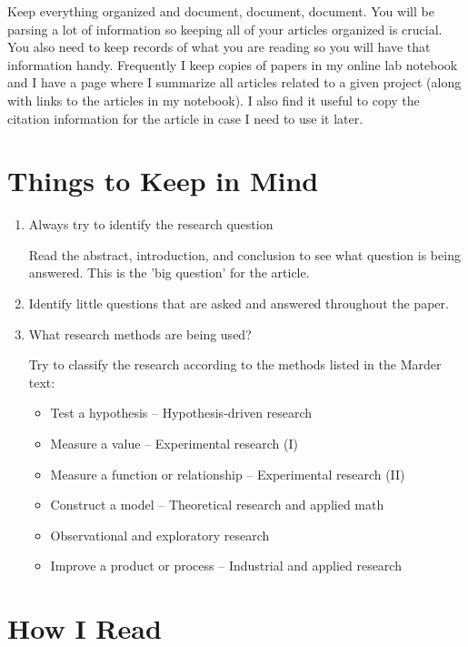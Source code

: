 \documentclass[12pt, letterpaper]{article}
\begin{document}
Keep everything organized and document, document, document.  You will be parsing a lot of information so keeping all of your articles organized is crucial.  You also need to keep records of what you are reading so you will have that information handy.  Frequently I keep copies of papers in my online lab notebook and I have a page where I summarize all articles related to a given project (along with links to the articles in my notebook).  I also find it useful to copy the citation information for the article in case I need to use it later.

\section*{Things to Keep in Mind}

\begin{enumerate}

\item Always try to identify the research question

Read the abstract, introduction, and conclusion to see what question is being answered.  This is the 'big question' for the article.

\item Identify little questions that are asked and answered throughout the paper.

\item What research methods are being used?

Try to classify the research according to the methods listed in the Marder text:

\begin{itemize}

\item Test a hypothesis – Hypothesis-driven research
\item Measure a value – Experimental research (I)
\item Measure a function or relationship – Experimental research (II)
\item Construct a model – Theoretical research and applied math
\item Observational and exploratory research
\item Improve a product or process – Industrial and applied research
\end{itemize}


\end{enumerate}

\section*{How I Read}
\end{document}
